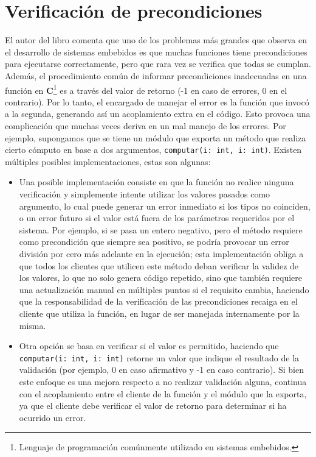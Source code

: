 \section{Verificación de precondiciones}
El autor del libro \cite{douglass} comenta que uno de los problemas más grandes que observa en el desarrollo de sistemas embebidos es que muchas funciones tiene precondiciones para ejecutarse correctamente, pero que rara vez se verifica que todas se cumplan. Además, el procedimiento común de informar precondiciones inadecuadas en una función en \textbf{C}\footnote{Lenguaje de programación comúnmente utilizado en sistemas embebidos.} es a través del valor de retorno (-1 en caso de errores, 0 en el contrario). Por lo tanto, el encargado de manejar el error es la función que invocó a la segunda, generando así un acoplamiento extra en el código. Esto provoca una complicación que muchas veces deriva en un mal manejo de los errores. Por ejemplo, supongamos que se tiene un módulo que exporta un método que realiza cierto cómputo en base a dos argumentos, \verb|computar(i: int, i: int)|. Existen múltiples posibles implementaciones, estas son algunas:
\begin{itemize}
    \item Una posible implementación consiste en que la función no realice ninguna verificación y simplemente intente utilizar los valores pasados como argumento, lo cual puede generar un error inmediato si los tipos no coinciden, o un error futuro si el valor está fuera de los parámetros requeridos por el sistema. Por ejemplo, si se pasa un entero negativo, pero el método requiere como precondición que siempre sea positivo, se podría provocar un error división por cero más adelante en la ejecución; esta implementación obliga a que todos los clientes que utilicen este método deban verificar la validez de los valores, lo que no solo genera código repetido, sino que también requiere una actualización manual en múltiples puntos si el requisito cambia, haciendo que la responsabilidad de la verificación de las precondiciones recaiga en el cliente que utiliza la función, en lugar de ser manejada internamente por la misma.
    \item Otra opción se basa en verificar si el valor es permitido, haciendo que \\ \verb|computar(i: int, i: int)| retorne un valor que indique el resultado de la validación (por ejemplo, 0 en caso afirmativo y -1 en caso contrario). Si bien este enfoque es una mejora respecto a no realizar validación alguna, continua con el acoplamiento entre el cliente de la función y el módulo que la exporta, ya que el cliente debe verificar el valor de retorno para determinar si ha ocurrido un error.
\end{itemize}

